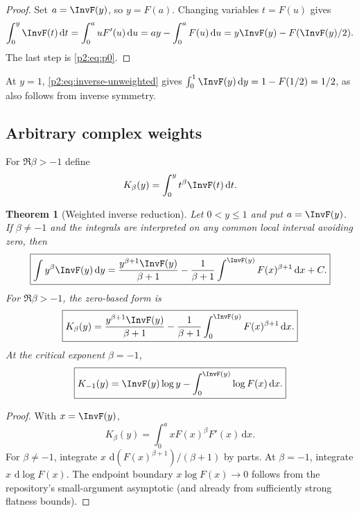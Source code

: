 \documentclass[11pt,oneside]{article}
\newtheorem{theorem}{Theorem}[section]
\theoremstyle{definition}
\theoremstyle{remark}
\newcommand{\dd}{\,\mathrm d}
\newcommand{\1}{\mathbf 1}
\begin{document}
\begin{proof}
Set $a=\InvF(y)$, so $y=F(a)$.  Changing variables $t=F(u)$ gives
\[
 \int_0^y\InvF(t)\dd t=\int_0^a uF'(u)\dd u
 =ay-\int_0^aF(u)\dd u
 =y\InvF(y)-F(\InvF(y)/2).
\]
The last step is \eqref{p2:eq:p0}.
\end{proof}

At $y=1$, \eqref{p2:eq:inverse-unweighted} gives
$\int_0^1\InvF(y)\dd y=1-F(1/2)=1/2$, as also follows from inverse symmetry.

\subsection{Arbitrary complex weights}
For $\Re\beta>-1$ define
\begin{equation}
 K_\beta(y)=\int_0^yt^\beta\InvF(t)\dd t.                 \label{p2:eq:Kbeta-def}
\end{equation}

\begin{theorem}[Weighted inverse reduction]
\label{p2:thm:inverse-weighted}
Let $0<y\le1$ and put $a=\InvF(y)$.  If $\beta\ne-1$ and the integrals are
interpreted on any common local interval avoiding zero, then
\begin{equation}
 \boxed{
 \int y^\beta\InvF(y)\dd y
 =\frac{y^{\beta+1}\InvF(y)}{\beta+1}
 -\frac1{\beta+1}\int^{\InvF(y)}F(x)^{\beta+1}\dd x+C.}  \label{p2:eq:inverse-weighted-local}
\end{equation}
For $\Re\beta>-1$, the zero-based form is
\begin{equation}
 \boxed{
 K_\beta(y)=\frac{y^{\beta+1}\InvF(y)}{\beta+1}
 -\frac1{\beta+1}\int_0^{\InvF(y)}F(x)^{\beta+1}\dd x.} \label{p2:eq:inverse-weighted}
\end{equation}
At the critical exponent $\beta=-1$,
\begin{equation}
 \boxed{
 K_{-1}(y)=\InvF(y)\log y-
 \int_0^{\InvF(y)}\log F(x)\dd x.}                       \label{p2:eq:inverse-critical}
\end{equation}
\end{theorem}

\begin{proof}
With $x=\InvF(y)$,
\[
 K_\beta(y)=\int_0^a xF(x)^\beta F'(x)\dd x.
\]
For $\beta\ne-1$, integrate $x\,\dd(F(x)^{\beta+1})/(\beta+1)$ by parts.  At
$\beta=-1$, integrate $x\,\dd\log F(x)$.  The endpoint boundary
$x\log F(x)\to0$ follows from the repository's small-argument asymptotic (and
already from sufficiently strong flatness bounds).
\end{proof}
\end{document}
